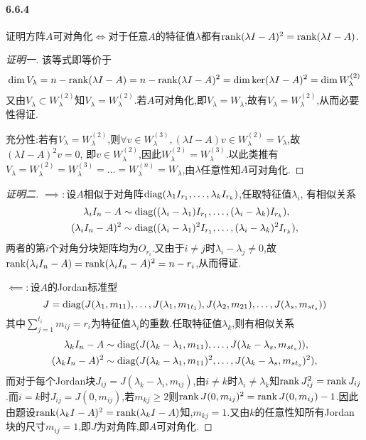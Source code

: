 \documentclass[11pt]{article}
\begin{document}
\paragraph{6.6.4}证明方阵$A$可对角化$\iff$对于任意$A$的特征值$\lambda$都有$\operatorname{rank} (\lambda I-A)^2=\operatorname{rank} (\lambda I-A)$.
\begin{proof}[证明一]
    该等式即等价于
    $$\dim V_{\lambda}=n-\operatorname{rank} (\lambda I-A)=n-\operatorname{rank} (\lambda I-A)^2=\dim \ker (\lambda I-A)^2= \dim W_{\lambda}^{(2)}$$
    又由$V_\lambda\subset W_{\lambda}^{(2)}$知$V_\lambda=W_{\lambda}^{(2)}$.若$A$可对角化,即$V_\lambda=W_\lambda$,故有$V_\lambda=W_{\lambda}^{(2)}$,从而必要性得证.
    
    充分性:若有$V_\lambda=W_{\lambda}^{(2)}$,则$\forall v\in W_\lambda^{(3)}, (\lambda I-A)v\in W_\lambda^{(2)}=V_\lambda$,故$(\lambda I-A)^2 v=0$, 即$v\in W_{\lambda}^{(2)}$,因此$W_{\lambda}^{(2)}=W_{\lambda}^{(3)}$.以此类推有$V_\lambda=W_{\lambda}^{(2)}=W_{\lambda}^{(3)}=\dots=W_{\lambda}^{(n)}=W_\lambda$,由$\lambda$任意性知$A$可对角化.
\end{proof}
\begin{proof}[证明二]
    $\implies:$设$A$相似于对角阵$\operatorname{diag}(\lambda_1 I_{r_1},\dots,\lambda_k I_{r_k})$,任取特征值$\lambda_i$, 有相似关系
    $$\begin{aligned}
        \lambda_i I_n-A &\sim \operatorname{diag}((\lambda_i-\lambda_1) I_{r_1}, \dots, (\lambda_i-\lambda_k) I_{r_k}),\\
        (\lambda_i I_n-A)^2 &\sim \operatorname{diag}((\lambda_i-\lambda_1)^2 I_{r_1}, \dots, (\lambda_i-\lambda_k)^2 I_{r_k}),
    \end{aligned}$$
    两者的第$i$个对角分块矩阵均为$O_{r_i}$.又由于$i\neq j$时$\lambda_i-\lambda_j\neq 0$,故$\operatorname{rank} (\lambda_i I_n-A)=\operatorname{rank} (\lambda_i I_n-A)^2=n-r_i$,从而得证.

    $\impliedby:$设$A$的Jordan标准型
    $$J=\operatorname{diag}(J(\lambda_1,m_{11}),\dots,J(\lambda_1,m_{1t_1}),J(\lambda_2,m_{21}),\dots,J(\lambda_s,m_{st_s}))$$
    其中$\sum_{j=1}^{t_i}m_{ij}=r_i$为特征值$\lambda_i$的重数.任取特征值$\lambda_k$,则有相似关系
    $$\begin{aligned}
        \lambda_k I_n-A &\sim \operatorname{diag}(J(\lambda_k-\lambda_1, m_{11}), \dots, J(\lambda_k-\lambda_s, m_{st_s})),\\
        (\lambda_k I_n-A)^2 &\sim \operatorname{diag}(J(\lambda_k-\lambda_1, m_{11})^2, \dots, J(\lambda_k-\lambda_s, m_{st_s})^2),
    \end{aligned}$$
    而对于每个Jordan块$J_{ij}=J(\lambda_k-\lambda_i,m_{ij})$,由$i\neq k$时$\lambda_i\neq \lambda_k$知$\operatorname{rank} J_{ij}^2=\operatorname{rank} J_{ij}$.而$i=k$时$J_{ij}=J(0,m_{ij})$,若$m_{kj}\geq 2$则$\operatorname{rank} J(0,m_{ij})^2=\operatorname{rank} J(0,m_{ij})-1$.因此由题设$\operatorname{rank} (\lambda_k I-A)^2=\operatorname{rank} (\lambda_k I-A)$知,$m_{kj}=1$.又由$k$的任意性知所有Jordan块的尺寸$m_{ij}=1$,即$J$为对角阵,即$A$可对角化.
\end{proof}
\end{document}
